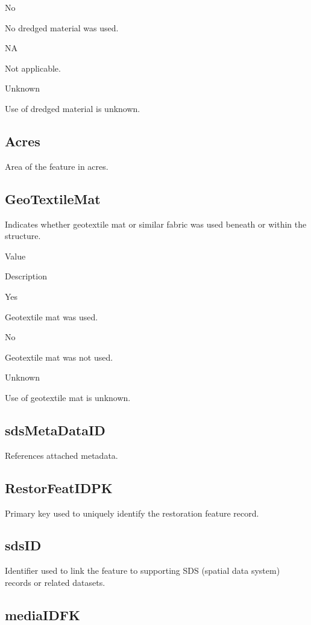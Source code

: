 \documentclass[
  letterpaper,
  DIV=11,
  numbers=noendperiod]{scrreprt}
\begin{document}
No

No dredged material was used.

NA

Not applicable.

Unknown

Use of dredged material is unknown.

\subsection{Acres}\label{acres-2}

Area of the feature in acres.

\subsection{GeoTextileMat}\label{geotextilemat}

Indicates whether geotextile mat or similar fabric was used beneath or
within the structure.

Value

Description

Yes

Geotextile mat was used.

No

Geotextile mat was not used.

Unknown

Use of geotextile mat is unknown.

\subsection{sdsMetaDataID}\label{sdsmetadataid-12}

References attached metadata.

\subsection{RestorFeatIDPK}\label{restorfeatidpk-12}

Primary key used to uniquely identify the restoration feature record.

\subsection{sdsID}\label{sdsid-12}

Identifier used to link the feature to supporting SDS (spatial data
system) records or related datasets.

\subsection{mediaIDFK}\label{mediaidfk-12}
\end{document}
